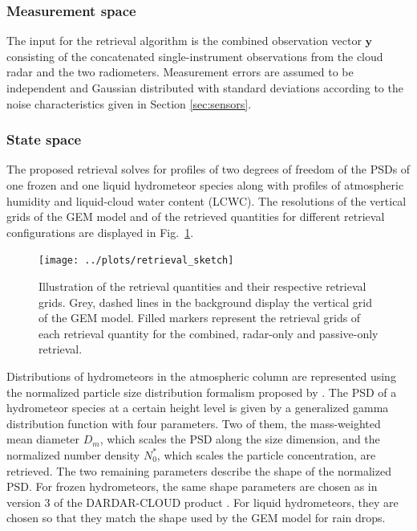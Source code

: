 \documentclass[journal abbreviation, manuscript]{copernicus}
\begin{document}
\subsubsection{Measurement space}
\label{sec:orge7dc286}

The input for the retrieval algorithm is the combined observation vector
$\mathbf{y}$ consisting of the concatenated single-instrument observations from
the cloud radar and the two radiometers. Measurement errors are assumed to be
independent and Gaussian distributed with standard deviations according to the
noise characteristics given in Section \ref{sec:sensors}.

\subsubsection{State space}
\label{sec:method:state_space}

The proposed retrieval solves for profiles of two degrees of freedom of the PSDs
of one frozen and one liquid hydrometeor species along with profiles of
atmospheric humidity and liquid-cloud water content (LCWC). The resolutions of
the vertical grids of the GEM model and of the retrieved quantities for
different retrieval configurations are displayed in
Fig.~\ref{fig:retrieval_sketch}.

\begin{figure}
\centering
\texttt{[image: ../plots/retrieval\_sketch]}
\caption{Illustration of the retrieval quantities and their respective retrieval
  grids. Grey, dashed lines in the background display the vertical grid of the GEM
  model.  Filled markers represent the retrieval grids of each retrieval quantity
  for the combined, radar-only and passive-only retrieval.}
\label{fig:retrieval_sketch}
\end{figure}

Distributions of hydrometeors in the atmospheric column are represented using
the normalized particle size distribution formalism proposed by
\cite{delanoe05}. The PSD of a hydrometeor species at a certain height level is
given by a generalized gamma distribution function with four parameters. Two of
them, the mass-weighted mean diameter $D_m$, which scales the PSD along the size
dimension, and the normalized number density $N_0^*$, which scales the particle
concentration, are retrieved. The two remaining parameters describe the
shape of the normalized PSD. For frozen hydrometeors, the same 
shape parameters are chosen as in version 3 of the DARDAR-CLOUD product
\citep{cazenave18}. For liquid hydrometeors, they are chosen so that they match
the shape used by the GEM model for rain drops.
\end{document}

